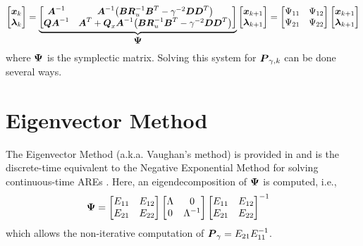 \begin{equation}
\begin{aligned}
	\begin{bmatrix}
		\vb*{x}_{k}\\ 
		\vb*{\lambda}_{k}
	\end{bmatrix} = \underbrace{
	\begin{bmatrix}
		\vb*{A}^{-1} & \vb*{A}^{-1} \big{(} \vb*{B} \vb*{R}_{u}^{-1} \vb*{B}^{T}
			- \gamma^{-2} \vb*{D}\vb*{D}^{T} \big{)} \\
		\vb*{Q} \vb*{A}^{-1} & \vb*{A}^{T} +\vb*{Q}_{x}\vb*{A}^{-1}
			\big{(} \vb*{B} \vb*{R}_{u}^{-1} \vb*{B}^{T}
			- \gamma^{-2} \vb*{D}\vb*{D}^{T} \big{)}\\
	\end{bmatrix} }_{\text{\normalsize {$\vb*{\Psi}$}}}
	\begin{bmatrix}
		\vb*{x}_{k+1}\\ 
		\vb*{\lambda}_{k+1}
	\end{bmatrix} =
	\begin{bmatrix}
		\Psi_{11} & \Psi_{12}\\
		\Psi_{21} & \Psi_{22}\\
	\end{bmatrix}
	\begin{bmatrix}
		\vb*{x}_{k+1}\\ 
		\vb*{\lambda}_{k+1}
	\end{bmatrix}
\end{aligned}
\end{equation}
where $\vb*{\Psi}$ is the symplectic matrix.  Solving this system for $\vb*{P}_{\gamma,k}$ can be done several ways.

\section{Eigenvector Method}
\label{appendix:numerical:eigenvector}
The Eigenvector Method (a.k.a. Vaughan's method) is provided in \cite{vaughan1970nonrecursive} and is the discrete-time equivalent to the Negative Exponential Method for solving continuous-time AREs \cite{vaughan1969negative}.  Here, an eigendecomposition of $\vb*{\Psi}$ is computed, i.e.,
\begin{equation}
\begin{aligned}
	\vb*{\Psi} &=
	\begin{bmatrix}
		E_{11} & E_{12}\\
		E_{21} & E_{22}\\
	\end{bmatrix}
	\begin{bmatrix}
		\Lambda & 0\\
		0 & \Lambda^{-1}\\
	\end{bmatrix}
	\begin{bmatrix}
		E_{11} & E_{12}\\
		E_{21} & E_{22}\\
	\end{bmatrix}^{-1}
\end{aligned}
\end{equation}
which allows the non-iterative computation of $\vb*{P}_{\gamma} = E_{21}E_{11}^{-1}$.

